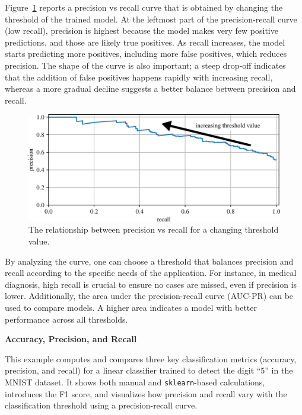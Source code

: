 \documentclass[12pt,letter]{article}
\begin{document}
\pagebreak

Figure~\ref{fig:precision_vs_recall} reports a precision vs recall curve that is obtained by changing the threshold of the trained model. At the leftmost part of the precision-recall curve (low recall), precision is highest because the model makes very few positive predictions, and those are likely true positives. As recall increases, the model starts predicting more positives, including more false positives, which reduces precision. The shape of the curve is also important; a steep drop-off indicates that the addition of false positives happens rapidly with increasing recall, whereas a more gradual decline suggests a better balance between precision and recall.

		\begin{figure}[H]
			\centering
			\includegraphics[width=6in]{../figures/precision_recall_curve}
			\caption{The relationship between precision vs recall for a changing threshold value.}
			\label{fig:precision_vs_recall}
		\end{figure}

By analyzing the curve, one can choose a threshold that balances precision and recall according to the specific needs of the application. For instance, in medical diagnosis, high recall is crucial to ensure no cases are missed, even if precision is lower. Additionally, the area under the precision-recall curve (AUC-PR) can be used to compare models. A higher area indicates a model with better performance across all thresholds.

\begin{example}
\textbf{Accuracy, Precision, and Recall}

\noindent This example computes and compares three key classification metrics (accuracy, precision, and recall) for a linear classifier trained to detect the digit ``5'' in the MNIST dataset. It shows both manual and \texttt{sklearn}-based calculations, introduces the F1 score, and visualizes how precision and recall vary with the classification threshold using a precision-recall curve.
\end{example}
\end{document}

